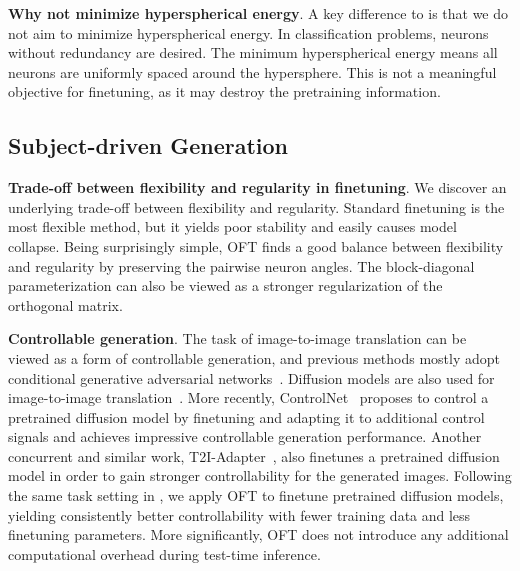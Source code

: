 \textbf{Why not minimize hyperspherical energy}. A key difference to \cite{liu2021orthogonal} is that we do not aim to minimize hyperspherical energy. In classification problems, neurons without redundancy are desired. The minimum hyperspherical energy means all neurons are uniformly spaced around the hypersphere. This is not a meaningful objective for finetuning, as it may destroy the pretraining information.



\subsection{Subject-driven Generation}

\textbf{Trade-off between flexibility and regularity in finetuning}. We discover an underlying trade-off between flexibility and regularity. Standard finetuning is the most flexible method, but it yields poor stability and easily causes model collapse. Being surprisingly simple, OFT finds a good balance between flexibility and regularity by preserving the pairwise neuron angles. The block-diagonal parameterization can also be viewed as a stronger regularization of the orthogonal matrix. 

\textbf{Controllable generation}. The task of image-to-image translation can be viewed as a form of controllable generation, and previous methods mostly adopt conditional generative adversarial networks~\cite{isola2017image,zhu2017toward,wang2018high,park2019semantic,choi2018stargan}. Diffusion models are also used for image-to-image translation~\cite{saharia2022palette,voynov2022sketch,wang2022pretraining}. More recently, ControlNet~\cite{zhang2023adding} proposes to control a pretrained diffusion model by finetuning and adapting it to additional control signals and achieves impressive controllable generation performance. Another concurrent and similar work, T2I-Adapter~\cite{mou2023t2i}, also finetunes a pretrained diffusion model in order to gain stronger controllability for the generated images. Following the same task setting in \cite{zhang2023adding,mou2023t2i}, we apply OFT to finetune pretrained diffusion models, yielding consistently better controllability with fewer training data and less finetuning parameters. More significantly, OFT does not introduce any additional computational overhead during test-time inference.


